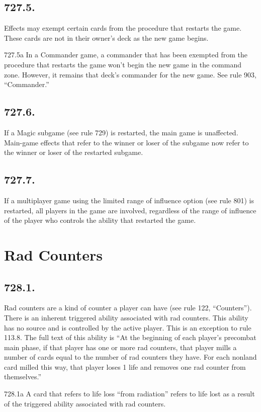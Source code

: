 \subsection*{727.5.}
Effects may exempt certain cards from the procedure that restarts the game. These cards are not in their owner’s deck as the new game begins.

727.5a In a Commander game, a commander that has been exempted from the procedure that restarts the game won’t begin the new game in the command zone. However, it remains that deck’s commander for the new game. See rule 903, “Commander.”

\subsection*{727.6.}
If a Magic subgame (see rule 729) is restarted, the main game is unaffected. Main-game effects that refer to the winner or loser of the subgame now refer to the winner or loser of the restarted subgame.

\subsection*{727.7.}
If a multiplayer game using the limited range of influence option (see rule 801) is restarted, all players in the game are involved, regardless of the range of influence of the player who controls the ability that restarted the game.

\section{Rad Counters}
\subsection*{728.1.}
Rad counters are a kind of counter a player can have (see rule 122, “Counters”). There is an inherent triggered ability associated with rad counters. This ability has no source and is controlled by the active player. This is an exception to rule 113.8. The full text of this ability is “At the beginning of each player’s precombat main phase, if that player has one or more rad counters, that player mills a number of cards equal to the number of rad counters they have. For each nonland card milled this way, that player loses 1 life and removes one rad counter from themselves.”

728.1a A card that refers to life loss “from radiation” refers to life lost as a result of the triggered ability associated with rad counters.

